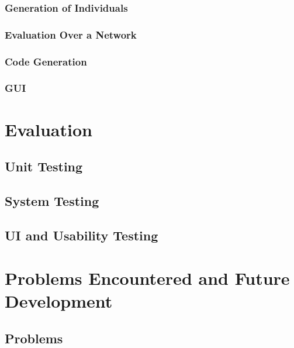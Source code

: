 \documentclass{l4proj}
\begin{document}
\subsection{Generation of Individuals}


\subsection{Evaluation Over a Network}


\subsection{Code Generation}


\subsection{GUI}


\chapter{Evaluation}

\section{Unit Testing}

\section{System Testing}

\section{UI and Usability Testing}

\chapter{Problems Encountered and Future Development}


\section{Problems}

\end{document}
